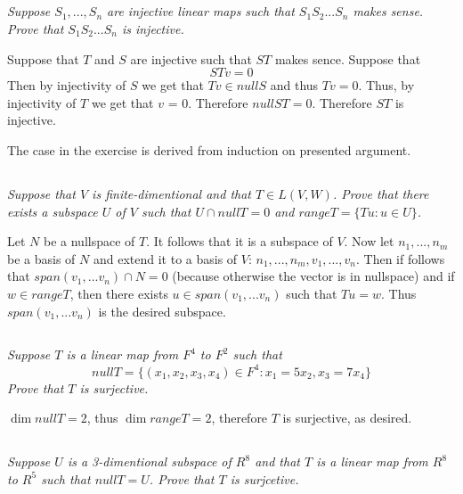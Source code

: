 \documentclass[11pt,oneside,titlepage]{book}
\begin{document}
\subsection{}
\textit{Suppose $S_1, ..., S_n$ are injective linear maps such that $S_1 S_2 ... S_n$ makes sense.
  Prove that $S_1 S_2 ... S_n$ is injective. }

Suppose that $T$ and $S$ are injective such that $ST$ makes sence. Suppose that
$$STv = 0$$
Then by injectivity of $S$ we get that $Tv \in null S$ and thus $Tv = 0$. Thus, by injectivity of
$T$ we get that $v$ = 0. Therefore $null ST = 0$. Therefore $ST$ is injective.

The case in the exercise is derived from induction on presented argument.

\subsection{}

\textit{Suppose that $V$ is finite-dimentional and that $T \in L(V, W)$. Prove that there exists
  a subspace $U$ of $V$ such that $U \cap null T = 0$ and $range T = \{Tu: u \in U\}$.}

Let $N$ be a nullspace of $T$. It follows that it is a subspace of $V$. Now let
$n_1, ..., n_m$ be a basis of $N$ and extend it to a basis of $V$: $n_1, ..., n_m, v_1, ..., v_n$.
Then if follows that $span(v_1, ... v_n) \cap N = 0$ (because otherwise the vector is in nullspace)
and if $w \in rangeT$, then there exists $u \in span(v_1, ... v_n)$ such that
$Tu = w$. Thus $span(v_1, ... v_n)$ is the desired subspace.

\subsection{}

\textit{Suppose $T$ is a linear map from $F^4$ to $F^2$ such that}
$$null T = \{(x_1, x_2, x_3, x_4) \in F^4: x_1 = 5x_2, x_3 = 7x_4\}$$
\textit{Prove that $T$ is surjective.}

$\dim null T = 2$, thus $\dim range T = 2$, therefore $T$ is surjective, as desired.

\subsection{}
\textit{Suppose $U$ is a 3-dimentional subspace of $R^8$ and that $T$ is a linear map from
  $R^8$ to $R^5$ such that $null T = U$. Prove that $T$ is surjcetive.}
\end{document}
